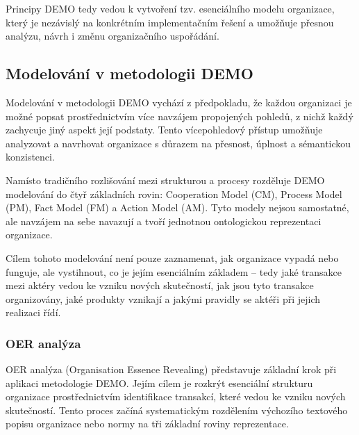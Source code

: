 \noindent Principy DEMO tedy vedou k vytvoření tzv. esenciálního modelu organizace, který je nezávislý na konkrétním implementačním řešení a umožňuje přesnou analýzu, návrh i změnu organizačního uspořádání. \cite{Dietz2020}


\subsection{Modelování v metodologii DEMO}
\label{sec:modelovani-v-demo}

Modelování v metodologii DEMO vychází z předpokladu, že každou organizaci je možné popsat prostřednictvím více navzájem propojených pohledů, z nichž každý zachycuje jiný aspekt její podstaty. Tento vícepohledový přístup umožňuje analyzovat a navrhovat organizace s důrazem na přesnost, úplnost a sémantickou konzistenci. \cite{Gouveia2017,Dietz2020}

Namísto tradičního rozlišování mezi strukturou a procesy rozděluje DEMO modelování do čtyř základních rovin: Cooperation Model (CM), Process Model (PM), Fact Model (FM) a Action Model (AM). Tyto modely nejsou samostatné, ale navzájem na sebe navazují a tvoří jednotnou ontologickou reprezentaci organizace. \cite{Pergl2023DEMO_modely}

Cílem tohoto modelování není pouze zaznamenat, jak organizace vypadá nebo funguje, ale vystihnout, co je jejím esenciálním základem – tedy jaké transakce mezi aktéry vedou ke vzniku nových skutečností, jak jsou tyto transakce organizovány, jaké produkty vznikají a jakými pravidly se aktéři při jejich realizaci řídí. \cite{Gouveia2017}


\subsubsection{OER analýza}
\label{sec:oer-analyza}

OER analýza (Organisation Essence Revealing) představuje základní krok při aplikaci metodologie DEMO. Jejím cílem je rozkrýt esenciální strukturu organizace prostřednictvím identifikace transakcí, které vedou ke vzniku nových skutečností. Tento proces začíná systematickým rozdělením výchozího textového popisu organizace nebo normy na tři základní roviny reprezentace. \cite{Dietz2020}

